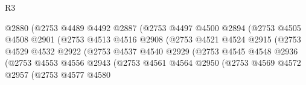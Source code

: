 \begin{lexlean}{R3}
\begin{coremodule}
                                    @2880
                                    (@2753
                                      @4489
                                      @4492
                                      @2887
                                      (@2753
                                        @4497
                                        @4500
                                        @2894
                                        (@2753
                                          @4505
                                          @4508
                                          @2901
                                          (@2753
                                            @4513
                                            @4516
                                            @2908
                                            (@2753
                                              @4521
                                              @4524
                                              @2915
                                              (@2753
                                                @4529
                                                @4532
                                                @2922
                                                (@2753
                                                  @4537
                                                  @4540
                                                  @2929
                                                  (@2753
                                                    @4545
                                                    @4548
                                                    @2936
                                                    (@2753
                                                      @4553
                                                      @4556
                                                      @2943
                                                      (@2753
                                                        @4561
                                                        @4564
                                                        @2950
                                                        (@2753
                                                          @4569
                                                          @4572
                                                          @2957
                                                          (@2753
                                                            @4577
                                                            @4580

\end{coremodule}
\end{lexlean}
